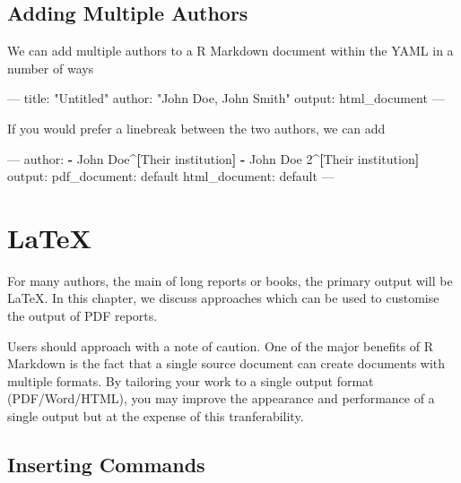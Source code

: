 \documentclass[]{book}
\newenvironment{Shaded}{\begin{snugshade}}{\end{snugshade}}
\newcommand{\KeywordTok}[1]{\textcolor[rgb]{0.13,0.29,0.53}{\textbf{#1}}}
\newcommand{\StringTok}[1]{\textcolor[rgb]{0.31,0.60,0.02}{#1}}
\newcommand{\OtherTok}[1]{\textcolor[rgb]{0.56,0.35,0.01}{#1}}
\newcommand{\FunctionTok}[1]{\textcolor[rgb]{0.00,0.00,0.00}{#1}}
\newcommand{\AttributeTok}[1]{\textcolor[rgb]{0.77,0.63,0.00}{#1}}
\newcommand{\NormalTok}[1]{#1}
\begin{document}
\section{Adding Multiple Authors}\label{adding-multiple-authors}

We can add multiple authors to a R Markdown document within the YAML in
a number of ways

\begin{Shaded}
\begin{Highlighting}[]
\OtherTok{---}
\FunctionTok{title:}\AttributeTok{ }\StringTok{"Untitled"}
\FunctionTok{author:}\AttributeTok{ }\StringTok{"John Doe, John Smith"}
\FunctionTok{output:}\AttributeTok{ html_document}
\OtherTok{---}
\end{Highlighting}
\end{Shaded}

If you would prefer a linebreak between the two authors, we can add

\begin{Shaded}
\begin{Highlighting}[]
\OtherTok{---}
\FunctionTok{author:}
\KeywordTok{-}\NormalTok{ John Doe^}\KeywordTok{[}\NormalTok{Their institution}\KeywordTok{]}
\KeywordTok{-}\NormalTok{ John Doe 2^}\KeywordTok{[}\NormalTok{Their institution}\KeywordTok{]}
\FunctionTok{output:}
  \FunctionTok{pdf_document:}\AttributeTok{ default}
  \FunctionTok{html_document:}\AttributeTok{ default}
\OtherTok{---}
\end{Highlighting}
\end{Shaded}

\chapter{LaTeX}\label{latex}

For many authors, the main of long reports or books, the primary output
will be LaTeX. In this chapter, we discuss approaches which can be used
to customise the output of PDF reports.

Users should approach with a note of caution. One of the major benefits
of R Markdown is the fact that a single source document can create
documents with multiple formats. By tailoring your work to a single
output format (PDF/Word/HTML), you may improve the appearance and
performance of a single output but at the expense of this
tranferability.

\section{Inserting Commands}\label{inserting-commands}
\end{document}

